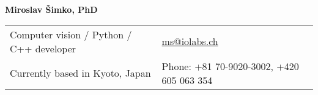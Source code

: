 \documentclass[a4paper,11pt,oneside]{article}
\begin{document}

\noindent  \LARGE{\textbf{Miroslav Šimko, PhD}}  \\
\vspace{-2ex}
\normalsize


\begin{center}
\begin{tabular}{l l}
 Computer vision / Python / C++ developer & \hspace{1in} \href{mailto:ms@iolabs.ch}{ms@iolabs.ch} \\
 Currently based in Kyoto, Japan & \hspace{1in} Phone: +81 70-9020-3002,  +420 605 063 354\\
\end{tabular}
\end{center}

\vspace{1em}

\end{document}
